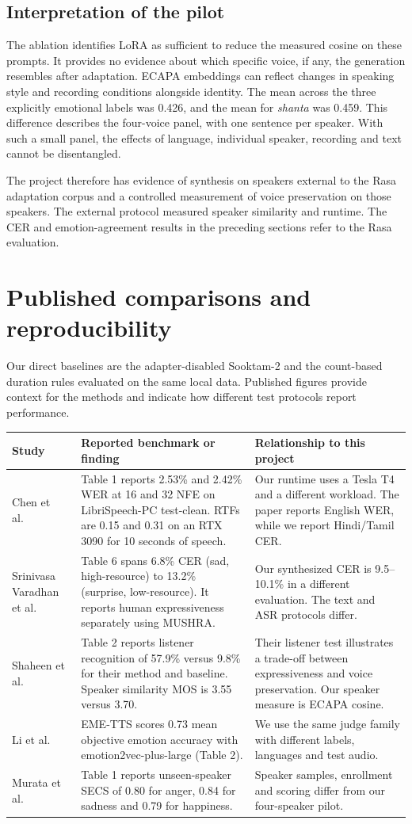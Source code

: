 \documentclass[11pt,a4paper]{article}
\newcommand{\sectionpage}[1]{\clearpage\section{#1}}
\begin{document}
\subsection{Interpretation of the pilot}
The ablation identifies LoRA as sufficient to reduce the measured cosine on these prompts. It provides no evidence about which specific voice, if any, the generation resembles after adaptation. ECAPA embeddings can reflect changes in speaking style and recording conditions alongside identity. The mean across the three explicitly emotional labels was 0.426, and the mean for \emph{shanta} was 0.459. This difference describes the four-voice panel, with one sentence per speaker. With such a small panel, the effects of language, individual speaker, recording and text cannot be disentangled.

The project therefore has evidence of synthesis on speakers external to the Rasa adaptation corpus and a controlled measurement of voice preservation on those speakers. The external protocol measured speaker similarity and runtime. The CER and emotion-agreement results in the preceding sections refer to the Rasa evaluation.

\sectionpage{Published comparisons and reproducibility}
Our direct baselines are the adapter-disabled Sooktam-2 and the count-based duration rules evaluated on the same local data. Published figures provide context for the methods and indicate how different test protocols report performance.

{\small
\begin{tabularx}{\linewidth}{@{}p{27mm}YY@{}}
\toprule
Study & Reported benchmark or finding & Relationship to this project \\
\midrule
Chen et al.\ \cite{f5} & Table 1 reports 2.53\% and 2.42\% WER at 16 and 32 NFE on LibriSpeech-PC test-clean. RTFs are 0.15 and 0.31 on an RTX 3090 for 10 seconds of speech. & Our runtime uses a Tesla T4 and a different workload. The paper reports English WER, while we report Hindi/Tamil CER. \\
Srinivasa Varadhan et al.\ \cite{rasa} & Table 6 spans 6.8\% CER (sad, high-resource) to 13.2\% (surprise, low-resource). It reports human expressiveness separately using MUSHRA. & Our synthesized CER is 9.5--10.1\% in a different evaluation. The text and ASR protocols differ. \\
Shaheen et al.\ \cite{shaheen} & Table 2 reports listener recognition of 57.9\% versus 9.8\% for their method and baseline. Speaker similarity MOS is 3.55 versus 3.70. & Their listener test illustrates a trade-off between expressiveness and voice preservation. Our speaker measure is ECAPA cosine. \\
Li et al.\ \cite{eme} & EME-TTS scores 0.73 mean objective emotion accuracy with emotion2vec-plus-large (Table 2). & We use the same judge family with different labels, languages and test audio. \\
Murata et al.\ \cite{murata} & Table 1 reports unseen-speaker SECS of 0.80 for anger, 0.84 for sadness and 0.79 for happiness. & Speaker samples, enrollment and scoring differ from our four-speaker pilot. \\
\bottomrule
\end{tabularx}}
\end{document}
